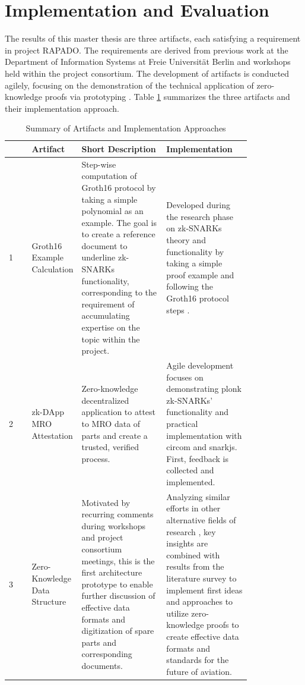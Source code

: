 \section{Implementation and Evaluation}
The results of this master thesis are three artifacts, each satisfying a requirement in project RAPADO. The requirements are derived from previous work at the Department of Information Systems at Freie Universit{\"a}t Berlin and workshops held within the project consortium. The development of artifacts is conducted agilely, focusing on the demonstration of the technical application of zero-knowledge proofs via prototyping \citep{mci/Wilde2007}. Table \ref{tab:summary_artifacts} summarizes the three artifacts and their implementation approach.
\setlength{\tabcolsep}{2ex}
\renewcommand{\arraystretch}{1.5}%
\begin{table}[htb]
	\centering
	    \caption{Summary of Artifacts and Implementation Approaches}
		\begin{tabular}{|m{0.001\linewidth} | m{0.11\linewidth} | m{0.35\linewidth} | m{0.35\linewidth} |}
		\hline
		\textbf{}& \textbf{Artifact} & \textbf{Short Description} & \textbf{Implementation} \\ \hline
            1&Groth16 Example \newline Calculation & Step-wise computation of Groth16 protocol by taking a simple polynomial as an example. The goal is to create a reference document to underline zk-SNARKs functionality, corresponding to the requirement of accumulating expertise on the topic within the project. & Developed during the research phase on zk-SNARKs theory and functionality by taking a simple proof example and following the Groth16 protocol steps \citep{Groth2016OnTS}. \\  \hline
            2&zk-DApp MRO \newline Attestation & Zero-knowledge decentralized application to attest to MRO data of parts and create a trusted, verified process. & Agile development focuses on demonstrating plonk zk-SNARKs' functionality and practical implementation with circom and snarkjs. First, feedback is collected and implemented. \\ \hline 
            3&Zero-Knowledge Data \newline Structure & Motivated by recurring comments during workshops and project consortium meetings, this is the first architecture prototype to enable further discussion of effective data formats and digitization of spare parts and corresponding documents. & Analyzing similar efforts in other alternative fields of research \citep{sedlemeirgrenenergy}, key insights are combined with results from the literature survey to implement first ideas and approaches to utilize zero-knowledge proofs to create effective data formats and standards for the future of aviation. \\ \hline 
	\end{tabular}
\label{tab:summary_artifacts}
\end{table}

